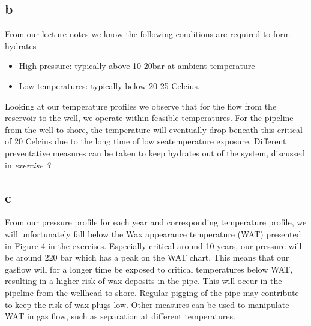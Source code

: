 \documentclass[a4paper,norsk]{article}
\begin{document}
\subsection*{b}
From our lecture notes we know the following conditions are required to form hydrates
\begin{itemize}
\item High pressure: typically above 10-20bar at ambient temperature
\item Low temperatures: typically below 20-25 Celcius.
\end{itemize}
Looking at our temperature profiles we observe that for the flow from the reservoir to the well, we operate within feasible temperatures. For the pipeline from the well to shore, the temperature will eventually drop beneath this critical of 20 Celcius due to the long time of low seatemperature exposure. Different preventative measures can be taken to keep hydrates out of the system, discussed in \textit{exercise 3}

\subsection*{c}
From our pressure profile for each year and corresponding temperature profile, we will unfortunately fall below the
Wax appearance temperature (WAT) presented in Figure 4 in the exercises. Especially critical around 10 years, our pressure will be around 220 bar which has a peak on the WAT chart. This means that our gasflow will for a longer time be exposed to critical temperatures below WAT, resulting in a higher risk of wax deposits in the pipe. This will occur in the pipeline from the wellhead to shore. Regular pigging of the pipe may contribute to keep the risk of wax plugs low. Other measures can be used to manipulate WAT in gas flow, such as separation at different temperatures. 
\end{document}
